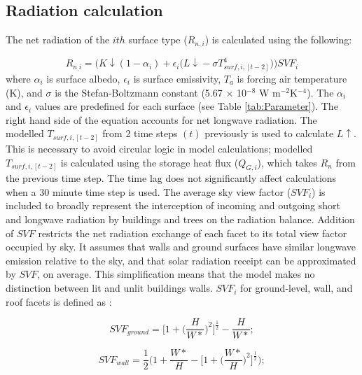 \documentclass[gmd, manuscript]{copernicus}
\begin{document}
\subsection{Radiation calculation}\label{sec:net}

The net radiation of the $ith$ surface type ($R_{n,i}$) is calculated using the following:

\begin{equation} 
R_{n_,i}  = \bigg(\ensuremath{K\downarrow} (1-\ensuremath{\alpha}_{i}) + \ensuremath{\epsilon}_{i} \big(\ensuremath{L\downarrow} - \ensuremath{\sigma} T_{surf,i,[t-2]}^{4}\big) \bigg)\ensuremath{SVF}_{i}
\label{eq:rn2} \end{equation} where \ensuremath{\alpha}$_{i}$ is surface albedo, \ensuremath{\epsilon}$_{i}$ is surface emissivity, \ensuremath{T_{a}} is forcing air temperature (K), and \ensuremath{\sigma} is the Stefan-Boltzmann constant (5.67 $\times$ 10$^{-8}$ W m$^{-2}$K$^{-4}$). The \ensuremath{\alpha}$_{i}$ and \ensuremath{\epsilon}$_{i}$ values are predefined for each surface (see Table \ref{tab:Parameter}).  The right hand side of the equation accounts for net longwave radiation. The modelled $T_{surf,i,[t-2]}$ from 2 time steps $(t)$ previously is used to calculate \ensuremath{L\uparrow}. This is necessary to avoid circular logic in model calculations; modelled $T_{surf,i,[t-2]}$ is calculated using  the storage heat flux (\ensuremath{Q_{G,i}}), which takes \ensuremath{R_{n}} from the previous time step.  The time lag does not significantly affect calculations when a 30 minute time step is used. The average sky view factor ($\ensuremath{SVF}_{i}$) is included to broadly represent the  interception of incoming and outgoing short and longwave radiation by buildings and trees on the radiation balance. Addition of \ensuremath{SVF} restricts the net radiation exchange of each facet to its total view factor occupied by sky. It assumes that walls and ground surfaces have similar longwave emission relative to the sky, and that solar radiation receipt can be approximated by \ensuremath{SVF}, on average. This simplification means that the model makes no distinction  between lit and unlit buildings walls.   $\ensuremath{SVF}_{i}$ for ground-level, wall, and roof facets is defined as \citep{Sparrow1978}:

\begin{equation}
SVF_{ground} = \Bigg[1+\bigg(\frac{H}{W*}\bigg)^2\Bigg]^\frac{1}{2} - \frac{H}{W*} ;
\end{equation} 

\begin{equation}
SVF_{wall} = \frac{1}{2} \Bigg( 1 + \frac{W*}{H} - \bigg[ 1 + \bigg(\frac{W*}{H}\bigg)^2\bigg]^\frac{1}{2} \Bigg) ;
\end{equation}
\end{document}
